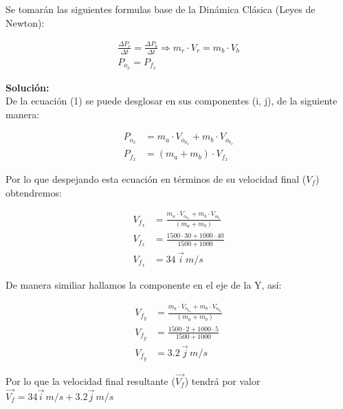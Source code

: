 \documentclass[11pt,letterpaper]{article}
\begin{document}
Se tomarán las siguientes formulas base de la Dinámica Clásica (Leyes de Newton):

\begin{align}
\boxed{ \frac{\Delta P_{r}}{\Delta t} = \frac{\Delta P_{b}}{\Delta t} \Rightarrow m_{r} \cdot V_{r} = m_{b} \cdot V_{b}}\\
\boxed{ P_{o_{x}} = P_{f_{x}}}
\end{align}

\textbf{Solución:}\\

De la ecuación (1) se puede desglosar en sus componentes (i, j), de la siguiente manera:

\begin{align}
P_{o_{x}} &= m_{a} \cdot V_{o_{a_{x}}} + m_{b} \cdot V_{o_{b_{x}}} \\
P_{f_{x}} &= (m_{a} + m_{b}) \cdot V_{f_{x}}
\end{align}

Por lo que despejando esta ecuación en términos de su velocidad final ($V_{f}$) obtendremos:

\begin{align*}
V_{f_{x}} &= \frac{m_{a} \cdot V_{o_{a_{x}}} + m_{b} \cdot V_{o_{b_{x}}}}{(m_{a} + m_{b}) }\\
V_{f_{x}} &= \frac{1500 \cdot 30 + 1000 \cdot 40}{1500 + 1000} \\
V_{f_{x}} &= 34\,\vec{i}\,m/s
\end{align*}

De manera similiar hallamos la componente en el eje de la Y, así:

\begin{align*}
V_{f_{y}} &= \frac{m_{a} \cdot V_{o_{a_{y}}} + m_{b} \cdot V_{o_{b_{y}}}}{(m_{a} + m_{b}) }\\
V_{f_{y}} &= \frac{1500 \cdot 2 + 1000 \cdot 5}{1500 + 1000} \\
V_{f_{y}} &= 3.2\,\vec{j}\,m/s
\end{align*}

Por lo que la velocidad final resultante ($\vec{V_{f}}$) tendrá por valor $\vec{V_{f}} = 34\vec{i}\,m/s + 3.2\vec{j}\,m/s$

\end{document}
